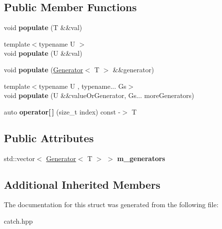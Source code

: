 \subsection*{Public Member Functions}
\begin{DoxyCompactItemize}
\item 
\mbox{\label{struct_catch_1_1_generators_1_1_generators_ad708036fa5a9bf0cd1520ce111bc851d}} 
void {\bfseries populate} (T \&\&val)
\item 
\mbox{\label{struct_catch_1_1_generators_1_1_generators_a8ff8b7dda734d1808b644fefc67f4c98}} 
{\footnotesize template$<$typename U $>$ }\\void {\bfseries populate} (U \&\&val)
\item 
\mbox{\label{struct_catch_1_1_generators_1_1_generators_a2155cad48ab03c362483e200d957eefc}} 
void {\bfseries populate} (\mbox{\hyperlink{class_catch_1_1_generators_1_1_generator}{Generator}}$<$ T $>$ \&\&generator)
\item 
\mbox{\label{struct_catch_1_1_generators_1_1_generators_a4b9680ee28e48e4dc4c4538b5510e649}} 
{\footnotesize template$<$typename U , typename... Gs$>$ }\\void {\bfseries populate} (U \&\&value\+Or\+Generator, Gs... more\+Generators)
\item 
\mbox{\label{struct_catch_1_1_generators_1_1_generators_a1812ebb7d0146d63e3a005e93831afa2}} 
auto {\bfseries operator\mbox{[}$\,$\mbox{]}} (size\+\_\+t index) const -\/$>$ T
\end{DoxyCompactItemize}
\subsection*{Public Attributes}
\begin{DoxyCompactItemize}
\item 
\mbox{\label{struct_catch_1_1_generators_1_1_generators_a49f1d0e8851a4726bb9981edffe094fa}} 
std\+::vector$<$ \mbox{\hyperlink{class_catch_1_1_generators_1_1_generator}{Generator}}$<$ T $>$ $>$ {\bfseries m\+\_\+generators}
\end{DoxyCompactItemize}
\subsection*{Additional Inherited Members}


The documentation for this struct was generated from the following file\+:\begin{DoxyCompactItemize}
\item 
catch.\+hpp\end{DoxyCompactItemize}
